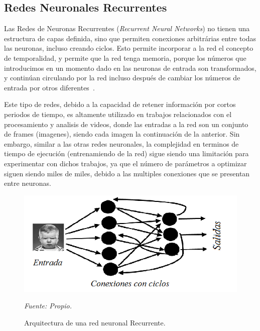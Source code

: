\subsection{Redes Neuronales Recurrentes}
Las Redes de Neuronas Recurrentes (\textit{Recurrent Neural Networks}) no tienen una estructura de capas definida, sino que permiten conexiones arbitrárias entre todas las neuronas, incluso creando ciclos. Esto permite incorporar a la red el concepto de temporalidad, y permite que la red tenga memoria, porque los números que introducimos en un momento dado en las neuronas de entrada son transformados, y continúan circulando por la red incluso después de cambiar los números de entrada por otros diferentes~\cite{18restrepo2015aplicacion}.

Este tipo de redes, debido a la capacidad de retener información por cortos periodos de tiempo, es altamente utilizado en trabajos relacionados con el procesamiento y analisis de videos, donde las entradas a la red son un conjunto de frames (imagenes), siendo cada imagen la continuación de la anterior. Sin embargo, similar a las otras redes neuronales, la complejidad en terminos de tiempo de ejecución (entrenamiendo de la red) sigue siendo una limitación para experimentar con dichos trabajos, ya que el número de parámetros a optimizar siguen siendo miles de miles, debido a las multiples conexiones que se presentan entre neuronas.  


\begin{figure}[H]
		\centering
		\includegraphics[width=130mm]{Imagenes/red_recurrente.png}
		\caption{Arquitectura de una red neuronal Recurrente.}
		\vspace{0.15cm}
		\textit{Fuente: Propio.}
		\label{fig:red_recurrente}
\end{figure}


